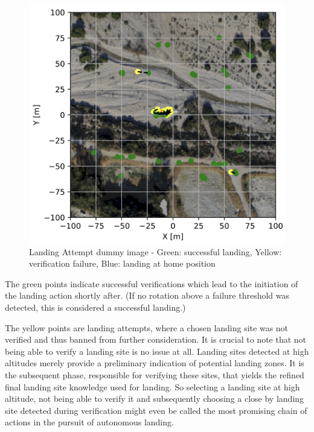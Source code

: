 \begin{figure}[h]
    \begin{center}
        \includegraphics[scale=0.5]{images/evaluation/landings_random_WP_GT.png}
        \caption{Landing Attempt dummy image - Green: successful landing, Yellow: verification failure, Blue: landing at home position}
        \label{fig:landing_attempts_dummy}
    \end{center}
\end{figure}

The green points indicate successful verifications which lead to the initiation of the landing action shortly after. (If no rotation above a failure threshold was detected, this is considered a successful landing.) 

The yellow points are landing attempts, where a chosen landing site was not verified and thus banned from further consideration. It is crucial to note that not being able to verify a landing site is no issue at all. Landing sites detected at high altitudes merely provide a preliminary indication of potential landing zones. It is the subsequent phase, responsible for verifying these sites, that yields the refined final landing site knowledge used for landing. So selecting a landing site at high altitude, not being able to verify it and subsequently choosing a close by landing site detected during verification might even be called the most promising chain of actions in the pursuit of autonomous landing.

